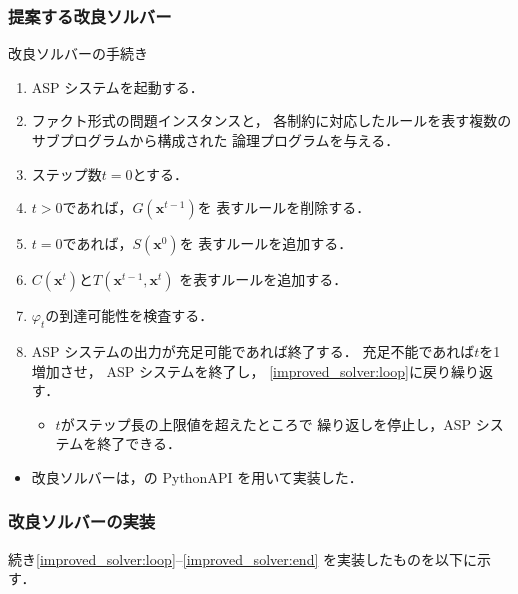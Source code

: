\documentclass[dvipdfmx,11pt]{beamer}
\begin{document}
\begin{frame}\frametitle{提案する改良ソルバー}

  \begin{block}{改良ソルバーの手続き}
    \begin{enumerate}
      \item ASP システムを起動する．
      \item ファクト形式の問題インスタンスと，
            各制約に対応したルールを表す複数のサブプログラムから構成された
            論理プログラムを与える．
      \item ステップ数$t=0$とする．
      \item $t>0$であれば，$G(\bm{x}^{t -1})$を
            表すルールを削除する． \label{improved_solver:loop}
      \item $t=0$であれば，$S(\bm{x}^0)$を
            表すルールを追加する．
      \item $C(\bm{x}^{t})$と$T(\bm{x}^{t-1},\bm{x}^{t})$
            を表すルールを追加する．
      \item $\varphi_{t}$の到達可能性を検査する．
      \item ASP システムの出力が充足可能であれば終了する．
            充足不能であれば$t$を1増加させ，
            ASP システムを終了し，
            \ref{improved_solver:loop}に戻り繰り返す．
            \begin{itemize}
              \item $t$がステップ長の上限値を超えたところで
                    繰り返しを停止し，ASP システムを終了できる．
            \end{itemize} \label{improved_solver:end}
    \end{enumerate}
  \end{block}

  \begin{itemize}
    \item 改良ソルバーは，{\clingo}の PythonAPI を用いて実装した．
  \end{itemize}

\end{frame}

\begin{frame}\frametitle{改良ソルバーの実装}

  続き\ref{improved_solver:loop}--\ref{improved_solver:end}
  を実装したものを以下に示す．
  \begin{exampleblock}{}
    
  \end{exampleblock}
  
\end{frame}
\end{document}
